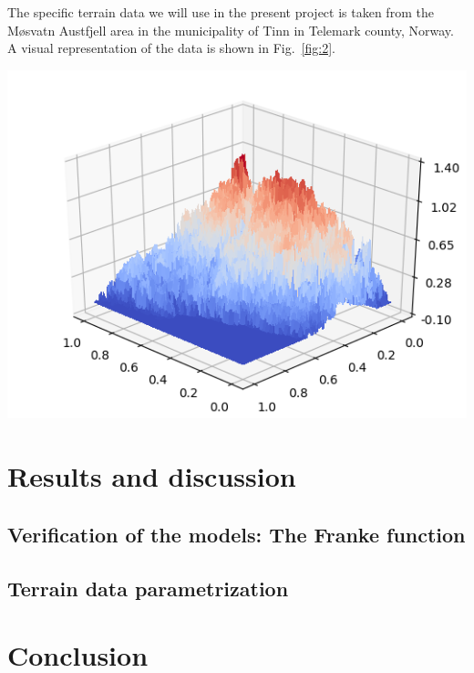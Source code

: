 \documentclass[a4paper]{article}
\newcommand{\fig}[1]{Fig.\ \ref{fig:#1}}
\newenvironment{Figure}
  {\par\medskip\noindent\minipage{\linewidth}}
  {\endminipage\par\medskip}
\begin{document}
\begin{multicols}{2}
The specific terrain data we will use in the present project is taken from the Møsvatn Austfjell area in the municipality of Tinn in Telemark county, Norway. A visual representation of the data is shown in \fig{2}. 

\begin{Figure}
\centering
\includegraphics[width=\linewidth]{terrain2.png}
\end{Figure}


\section{Results and discussion}
\subsection{Verification of the models: The Franke function}
\lipsum[3]
\subsection{Terrain data parametrization}
\lipsum[3]

\section{Conclusion}
\lipsum[3]
\end{multicols}


\printbibliography[heading=bibintoc]
\end{document}
